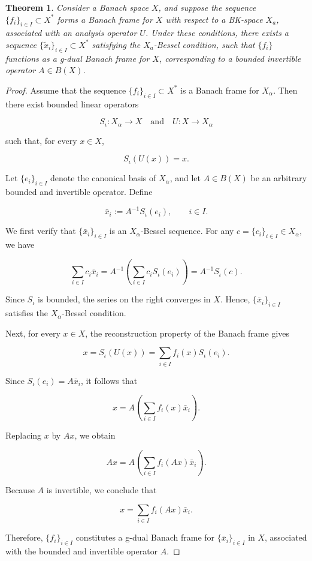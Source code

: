 \documentclass[12pt]{article}
\newtheorem{theorem}{Theorem}[section]
\theoremstyle{definition}
\theoremstyle{remark}
\begin{document}
\begin{theorem}
Consider a Banach space \( X \), and suppose the sequence \( \{f_i\}_{i \in I} \subset X^* \) forms a Banach frame for \( X \) with respect to a BK-space \( X_a \), associated with an analysis operator \( U \). Under these conditions, there exists a sequence \( \{\tilde{x}_i\}_{i \in I} \subset X^* \) satisfying the \( X_a \)-Bessel condition, such that \( \{f_i\} \) functions as a g-dual Banach frame for \( X \), corresponding to a bounded invertible operator \( A \in B(X) \).
\end{theorem}
\begin{proof}
Assume that the sequence \(\{f_i\}_{i\in I}\subset X^*\) is a Banach frame for \(X_\alpha\). Then there exist bounded linear operators

$$
S_\iota:X_\alpha\to X
\quad\text{and}\quad
U:X\to X_\alpha
$$

such that, for every \(x\in X\),

$$
S_\iota(U(x))=x.
$$

Let \(\{e_i\}_{i\in I}\) denote the canonical basis of \(X_\alpha\), and let
\(A\in B(X)\) be an arbitrary bounded and invertible operator. Define

$$
\bar{x}_i:=A^{-1}S_\iota(e_i),
\qquad i\in I.
$$

We first verify that \(\{\bar{x}_i\}_{i\in I}\) is an
\(X_\alpha\)-Bessel sequence. For any \(c=\{c_i\}_{i\in I}\in X_\alpha\),
we have

$$
\sum_{i\in I}c_i\bar{x}_i
=
A^{-1}\left(\sum_{i\in I}c_iS_\iota(e_i)\right)
=
A^{-1}S_\iota(c).
$$

Since \(S_\iota\) is bounded, the series on the right converges in \(X\).
Hence, \(\{\bar{x}_i\}_{i\in I}\) satisfies the \(X_\alpha\)-Bessel
condition.

Next, for every \(x\in X\), the reconstruction property of the Banach
frame gives

$$
x
=
S_\iota(U(x))
=
\sum_{i\in I}f_i(x)S_\iota(e_i).
$$

Since \(S_\iota(e_i)=A\bar{x}_i\), it follows that

$$
x
=
A\left(\sum_{i\in I}f_i(x)\bar{x}_i\right).
$$

Replacing \(x\) by \(Ax\), we obtain

$$
Ax
=
A\left(\sum_{i\in I}f_i(Ax)\bar{x}_i\right).
$$

Because \(A\) is invertible, we conclude that

$$
x
=
\sum_{i\in I}f_i(Ax)\bar{x}_i.
$$

Therefore, \(\{f_i\}_{i\in I}\) constitutes a g-dual Banach frame for
\(\{\bar{x}_i\}_{i\in I}\) in \(X\), associated with the bounded and
invertible operator \(A\).
\end{proof}
\end{document}
